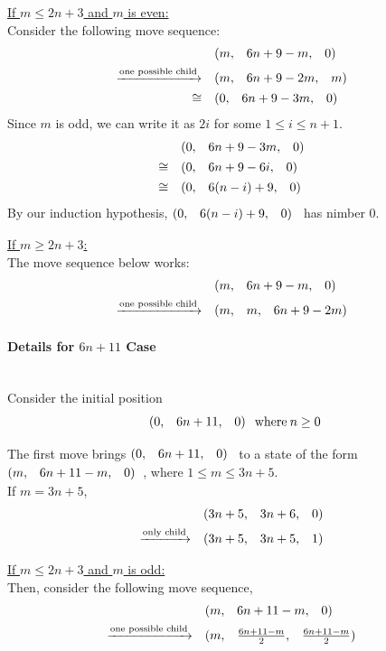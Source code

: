 \documentclass{article}
\makeatletter
\newcommand{\game}[3]{\begin{array}{@{}*6r}(#1, & #2, & #3)\end{array}}
\makeatother
\begin{document}
\bigskip
\underline{If $m \leq 2n + 3$ and $m$ is even:} \\
Consider the following move sequence:
\begin{align*}
  & \game{m}{6n+9-m}{0} \\
  \xrightarrow{\text{one possible child}} \quad & 
  \game{m}{6n+9-2m}{m} \\
  \cong \quad & 
  \game{0}{6n+9-3m}{0} \\
\end{align*}
Since $m$ is odd, we can write it as $2i$ for some $1\leq i\leq n+1$.
\begin{align*}
  & \game{0}{6n+9-3m}{0} \\
  \cong \quad & \game{0}{6n+9-6i}{0} \\
  \cong \quad & \game{0}{6(n-i)+9}{0} \\
\end{align*}
By our induction hypothesis, $\game{0}{6(n-i)+9}{0}$ has nimber $0$.

\bigskip
\underline{If $m \geq 2n + 3$:} \\
The move sequence below works:
\begin{align*}
  & \game{m}{6n+9-m}{0} \\
  \xrightarrow{\text{one possible child}} \quad & 
  \game{m}{m}{6n+9-2m}
\end{align*}
\newpage

\paragraph{Details for $6n+11$ Case}\mbox{}\\
Consider the initial position
\begin{equation*}
  \game{0}{6n+11}{0} \: \text{where} \: n \geq 0
\end{equation*}

\medskip
The first move brings $\game{0}{6n+11}{0}$ to a state of the form
$\game{m}{6n+11-m}{0}$, where $1 \leq m \leq 3n+5$. \\
If $m = 3n + 5$,
\begin{align*}
  & \game{3n+5}{3n+6}{0} \\
  \xrightarrow{\text{only child}} \quad & 
  \game{3n+5}{3n+5}{1}
\end{align*}

\bigskip
\underline{If $m \leq 2n + 3$ and $m$ is odd:} \\
Then, consider the following move sequence,
\begin{align*}
  & \game{m}{6n+11-m}{0} \\
  \xrightarrow{\text{one possible child}} \quad & 
  \game{m}{\frac{6n+11-m}{2}}{\frac{6n+11-m}{2}}
\end{align*}
\end{document}
